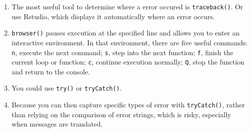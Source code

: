 \begin{itemize}
\begin{Shaded}
\begin{Highlighting}[]
\StringTok{ } 
  \StringTok{ }
  \NormalTok{(}\NormalTok{(}\NormalTok{, n), x[}\StringTok{ }\NormalTok{n)])}
\NormalTok{\}}
\end{Highlighting}
\end{Shaded}
\end{itemize}


\begin{enumerate}
\def\labelenumi{\arabic{enumi}.}
\item
  The most useful tool to determine where a error occured is
  \texttt{traceback()}. Or use Rstudio, which displays it automatically
  where an error occurs.
\item
  \texttt{browser()} pauses execution at the specified line and allows
  you to enter an interactive environment. In that environment, there
  are five useful commands: \texttt{n}, execute the next command;
  \texttt{s}, step into the next function; \texttt{f}, finish the
  current loop or function; \texttt{c}, continue execution normally;
  \texttt{Q}, stop the function and return to the console.
\item
  You could use \texttt{try()} or \texttt{tryCatch()}.
\item
  Because you can then capture specific types of error with
  \texttt{tryCatch()}, rather than relying on the comparison of error
  strings, which is risky, especially when messages are translated.
\end{enumerate}
